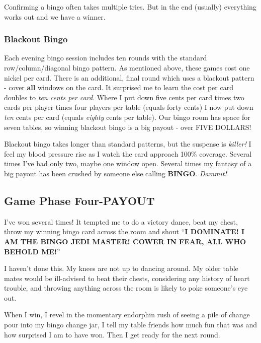 \documentclass[
  letterpaper,
  DIV=11,
  numbers=noendperiod]{scrartcl}
\begin{document}
Confirming a bingo often takes multiple tries. But in the end (usually)
everything works out and we have a winner.

\hypertarget{blackout-bingo}{%
\subsubsection{Blackout Bingo}\label{blackout-bingo}}

Each evening bingo session includes ten rounds with the standard
row/column/diagonal bingo pattern. As mentioned above, these games cost
one nickel per card. There is an additional, final round which uses a
blackout pattern - cover \textbf{all} windows on the card. It surprised
me to learn the cost per card doubles to \emph{ten cents per card}.
Where I put down five cents per card times two cards per player times
four players per table (equals forty cents) I now put down \emph{ten}
cents per card (equals \emph{eighty} cents per table). Our bingo room
has space for seven tables, so winning blackout bingo is a big payout -
over FIVE DOLLARS!

Blackout bingo takes longer than standard patterns, but the suspense is
\emph{killer!} I feel my blood pressure rise as I watch the card
approach 100\% coverage. Several times I've had only two, maybe one
window open. Several times my fantasy of a big payout has been crushed
by someone else calling \textbf{BINGO}. \emph{Dammit!}

\hypertarget{game-phase-four-payout}{%
\subsection{Game Phase Four-PAYOUT}\label{game-phase-four-payout}}

I've won several times! It tempted me to do a victory dance, beat my
chest, throw my winning bingo card across the room and shout ``\textbf{I
DOMINATE! I AM THE BINGO JEDI MASTER! COWER IN FEAR, ALL WHO BEHOLD
ME!}''

I haven't done this. My knees are not up to dancing around. My older
table mates would be ill-advised to beat their chests, considering any
history of heart trouble, and throwing anything across the room is
likely to poke someone's eye out.

When I win, I revel in the momentary endorphin rush of seeing a pile of
change pour into my bingo change jar, I tell my table friends how much
fun that was and how surprised I am to have won. Then I get ready for
the next round.
\end{document}
